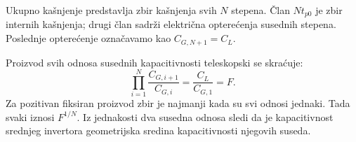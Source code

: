 Ukupno kašnjenje predstavlja zbir kašnjenja svih $N$ stepena. Član $Nt_{p0}$ je zbir internih kašnjenja; drugi član sadrži električna opterećenja susednih stepena. Poslednje opterećenje označavamo kao $C_{G,N+1}=C_L$.

Proizvod svih odnosa susednih kapacitivnosti teleskopski se skraćuje:
\[\prod_{i=1}^N\frac{C_{G,i+1}}{C_{G,i}}=\frac{C_L}{C_{G,1}}=F.
\]
Za pozitivan fiksiran proizvod zbir je najmanji kada su svi odnosi jednaki. Tada svaki iznosi $F^{1/N}$. Iz jednakosti dva susedna odnosa sledi da je kapacitivnost srednjeg invertora geometrijska sredina kapacitivnosti njegovih suseda.
